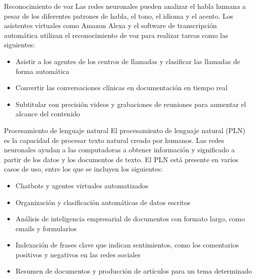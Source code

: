 \documentclass[11pt,aspectratio=169]{beamer}
\begin{document}
\begin{frame}{Reconocimiento de voz}
	Las redes neuronales pueden analizar el habla humana a pesar de los diferentes patrones de habla, el tono, el idioma y el acento.\pause
	Los asistentes virtuales como Amazon Alexa y el software de transcripción automática utilizan el reconocimiento de voz para realizar
	tareas como las siguientes:\pause
	\begin{itemize}
		\item Asistir a los agentes de los centros de llamadas y clasificar las llamadas de forma automática\pause
		\item Convertir las conversaciones clínicas en documentación en tiempo real\pause
		\item Subtitular con precisión videos y grabaciones de reuniones para aumentar el alcance del contenido	
	\end{itemize}
\end{frame}

\begin{frame}{Procesamiento de lenguaje natural}
	El procesamiento de lenguaje natural (PLN) es la capacidad de procesar texto natural creado por humanos.\pause
	Las redes neuronales ayudan a las computadoras a obtener información y significado a partir de los datos y los documentos de texto.\pause
	El PLN está presente en varios casos de uso, entre los que se incluyen los siguientes:\pause
	\begin{itemize}
		\item Chatbots y agentes virtuales automatizados \pause
		\item Organización y clasificación automáticas de datos escritos\pause 
		\item Análisis de inteligencia empresarial de documentos con formato largo, como emails y formularios\pause 
		\item Indexación de frases clave que indican sentimientos, como los comentarios positivos y negativos en las redes sociales\pause
		\item Resumen de documentos y producción de artículos para un tema determinado
	\end{itemize}
\end{frame}
\end{document}
